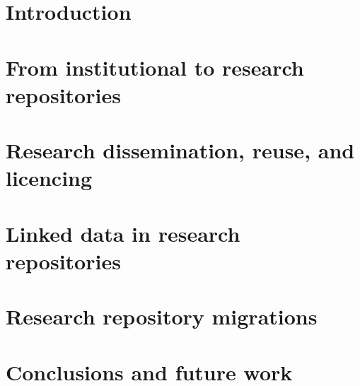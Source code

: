 \documentclass[12pt,a4paper,twoside,openright]{report}
\newcommand\blankpage{%
    \null
    \thispagestyle{empty}%
    \newpage}
\begin{document}

    
    \blankpage

    
    \blankpage
    
    \begin{abstract}
        
    \end{abstract}
    \blankpage

    \printglossary[type=\acronymtype,title=Abbreviations]
    \tableofcontents

    \cleardoublepage 


    
    \chapter{Introduction}
        \label{ch:intro}
        

    \chapter{From institutional to research repositories}
        \label{ch:evolution}
        

    \chapter{Research dissemination, reuse, and licencing}
        \label{ch:blockchain}
        

    \chapter{Linked data in research repositories}
        \label{ch:rdf}
        

    \chapter{Research repository migrations}
        \label{ch:migration}
        

    \chapter{Conclusions and future work}
        \label{ch:outro}
        

    \printbibliography
\end{document}
